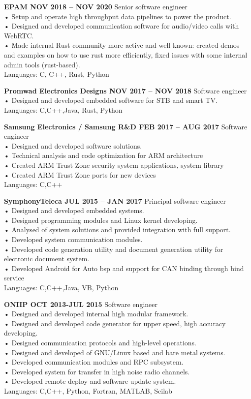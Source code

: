 \documentclass{article}
\begin{document}
\bigskip\noindent
\textbf{EPAM NOV 2018 – NOV 2020}
Senior software engineer\\
• Setup and operate high throughput data pipelines to power the product.\\
• Designed and developed communication software for audio/video calls with WebRTC.\\
• Made internal Rust community more active and well-known: created demos and examples on how to use rust
more efficiently, fixed issues with some internal admin tools (rust-based).\\
Languages: C, C++, Rust, Python

\bigskip\noindent
\textbf{Promwad Electronics Designs NOV 2017 – NOV 2018}
Software engineer\\
• Designed and developed embedded software for STB and smart TV.\\
Languages: C,C++,Java, Rust, Python

\bigskip\noindent
\textbf{Samsung Electronics / Samsung R\&D FEB 2017 – AUG 2017}
Software engineer\\
• Designed and developed software solutions.\\
• Technical analysis and code optimization for ARM architecture\\
• Created ARM Trust Zone security system applications, system library\\
• Created ARM Trust Zone ports for new devices\\
Languages: C,C++

\bigskip\noindent
\textbf{SymphonyTeleca JUL 2015 – JAN 2017}
Principal software engineer\\
• Designed and developed embedded systems.\\
• Designed programming modules and Linux kernel developing.\\
• Analysed of system solutions and provided integration with full support.\\
• Developed system communication modules.\\
• Developed code generation utility and document generation utility for electronic document system.\\
• Developed Android for Auto bsp and support for CAN binding through bind service\\
Languages: C,C++,Java, VB, Python

\bigskip\noindent
\textbf{ONIIP OCT 2013-JUL 2015}
Software engineer\\
• Designed and developed internal high modular framework.\\
• Designed and developed code generator for upper speed, high accuracy developing.\\
• Designed communication protocols and high-level operations.\\
• Designed and developed of GNU/Linux based and bare metal systems.\\
• Developed communication modules and RPC subsystem.\\
• Developed system for transfer in high noise radio channels.\\
• Developed remote deploy and software update system.\\
Languages: C,C++, Python, Fortran, MATLAB, Scilab
\end{document}
